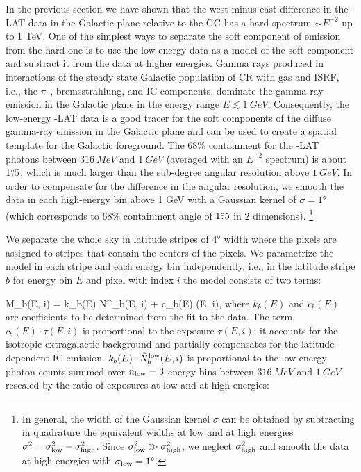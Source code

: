 In the previous section we have shown that the west-minus-east difference in the \Fermi-LAT data in the Galactic plane relative to the GC has a hard 
spectrum $\sim E^{-2}$ up to 1 TeV.
One of the simplest ways to separate the soft component of emission from the hard one is to use the low-energy data as
a model of the soft component and subtract it from the data at higher energies.
Gamma rays produced in interactions of the steady state Galactic population of CR with gas and ISRF,
i.e., the $\pi^0$, bremsstrahlung, and IC components,
dominate the gamma-ray emission in the Galactic plane in the energy range $E \lesssim \SI{1}{GeV}$. 
Consequently, the low-energy \Fermi-LAT data is a good tracer for the soft components of the
diffuse gamma-ray emission in the Galactic plane and can be used to create a spatial template for the Galactic foreground.
The 68\% containment for the \Fermi-LAT photons between $\SI{316}{MeV}$ and $\SI{1}{GeV}$ (averaged with an $E^{-2}$ spectrum) is about 
$1{\overset{\circ}{.}}5$,
which is much larger than the sub-degree angular resolution above $\SI{1}{GeV}$.
In order to compensate for the difference in the angular resolution, 
we smooth the data in each high-energy bin above 1 GeV
with a Gaussian kernel of $\sigma = \ang{1}$ (which corresponds to $68\%$ containment angle of
$1{\overset{\circ}{.}}5$ in 2 dimensions).%
\footnote{In general, the width of the Gaussian kernel $\sigma$ can be obtained by subtracting in quadrature
the equivalent widths at low and at high energies $\sigma^2 = \sigma_{\rm low}^2 - \sigma_{\rm high}^2$.
Since $\sigma_{\rm low}^2 \gg \sigma_{\rm high}^2$, we neglect $\sigma_{\rm high}^2$ and smooth the 
data at high energies with $\sigma_{\rm low} = 1^\circ$.}

We separate the whole sky in latitude stripes of $\ang{4}$ width where the \Healpix pixels are assigned to stripes that contain the centers of the pixels.
We parametrize the model in each stripe and each energy bin independently, i.e., 
in the latitude stripe $b$ for energy bin $E$ and \Healpix pixel with index $i$ the model consists of two terms:

\be
{}
M_{b}(E, i) = k_{b}(E) \cdot \tilde N^\low_{b}(E, i) + c_b(E) \cdot \tau(E, i),
\ee
where $k_{b}(E)$ and $c_b(E)$ are coefficients to be determined from the fit to the data.
The term $c_b(E) \cdot \tau(E, i)$ is proportional to the exposure $\tau(E, i)$: it accounts for the isotropic extragalactic background and partially compensates for 
the latitude-dependent IC emission.
$k_{b}(E) \cdot \tilde N^{\text{low}}_b(E, i)$ is proportional to the low-energy photon counts summed over 
$n_{\text{low}} = 3$ energy bins between $\SI{316}{MeV}$ and $\SI{1}{GeV}$ 
rescaled by the ratio of exposures at low and at high energies:

